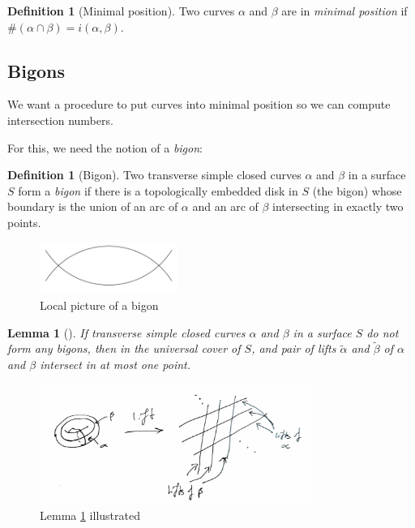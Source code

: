 \documentclass[reqno]{amsart}
\newtheorem{lemma}[theorem]{Lemma}
\theoremstyle{definition}
\newtheorem{definition}[theorem]{Definition}
\theoremstyle{remark}
\begin{document}
\begin{definition}[Minimal position]
    Two curves $\alpha$ and $\beta$ are in \textit{minimal
    position} if $\# \left( \alpha \cap \beta \right) =
    i\left( \alpha, \beta \right) $.
\end{definition}

\subsection*{Bigons}

We want a procedure to put curves into minimal position so
we can compute intersection numbers.

For this, we need the notion of a \textit{bigon}:

\begin{definition}[Bigon]
    Two transverse simple closed curves $\alpha$ and $\beta$ 
    in a surface $S$ form a \textit{bigon} if there is a
    topologically embedded disk in $S$ (the bigon) whose
    boundary is the union of an arc of $\alpha$ and an
    arc of  $\beta$ intersecting in exactly two points.
\end{definition}

\begin{figure}[http]
    \centering
    \includegraphics[width=0.4\textwidth]{bigon.png}
    \caption{Local picture of a bigon}
    \label{fig:bigon}
\end{figure}

\begin{lemma}[]\label{lemma-intersections-of-lifts}
    If transverse simple closed curves $\alpha$ and $\beta$ in
    a surface $S$ do not form any bigons, then in the
    universal cover of $S$, and pair of lifts
    $\tilde{\alpha}$ and $\tilde{\beta}$ of $\alpha$ and $\beta$ 
    intersect in at most one point.
\end{lemma}

\begin{figure}[h]
    \centering
    \includegraphics[width=0.8\textwidth]{lemma-1-8.jpg}
    \caption{Lemma \ref{lemma-intersections-of-lifts} illustrated}
    \label{fig:lemma-1-8-jpg}
\end{figure}
\end{document}
